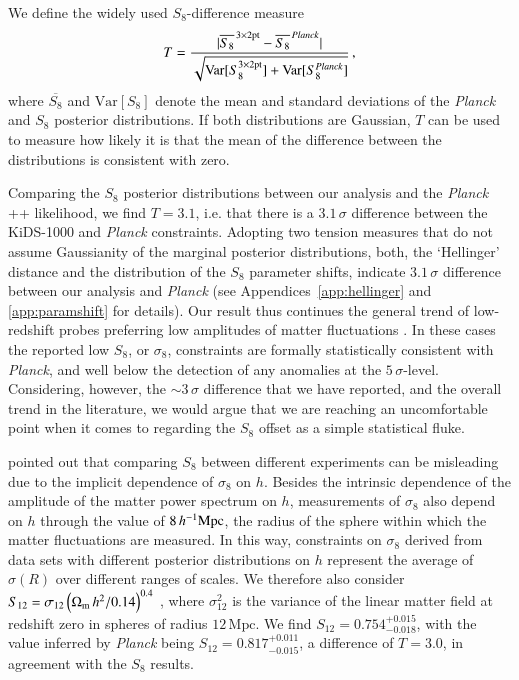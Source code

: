 We define the widely used $S_8$-difference measure
\begin{equation}
\label{eq: std_tension}
T = \frac{|\overline{S_{8}}^{\,\rm 3\times2pt}-\overline{S_{8}}^{\,\it Planck}|}{\sqrt{\mathrm{Var}[S_{8}^{\rm 3\times2pt}] + \mathrm{Var}[S_{8}^{\it Planck}]}} \,,
\end{equation}
where $\overline{S_{8}}$ and $\mathrm{Var}[S_{8}] $ denote the mean and standard deviations of the {\it Planck} and \tttp $S_8$ posterior distributions.  If both distributions are Gaussian, $T$ can be used to measure how likely it is that the mean of the difference between the distributions is consistent with zero.

Comparing the $S_{8}$ posterior distributions between our \tttp analysis and the {\it Planck} ++ likelihood, we find $T=3.1$, i.e. that there is a $3.1\,\sigma$ difference between the KiDS-1000 and {\it Planck} constraints. 
%  
Adopting two tension measures that do not assume Gaussianity of the marginal posterior distributions, both, the `Hellinger' distance and the distribution of the $S_{8}$ parameter shifts, indicate $3.1\,\sigma$ difference between our \tttp analysis and {\it Planck} (see Appendices~\ref{app:hellinger} and \ref{app:paramshift} for details).  
%
Our result thus continues the general trend of low-redshift probes preferring low amplitudes of matter fluctuations \citep{heymans/etal:2013, alam/etal:2017, abbott/etal:2018, hikage/etal:2019, bocquet/etal:2019, wright/etal:2020b,DESclusters/etal:2020}. 
In these cases the reported low $S_8$, or $\sigma_8$, constraints are formally statistically consistent with {\it Planck}, and well below the detection of any anomalies at the $5\,\sigma$-level. 
Considering, however, the $\sim\! 3\,\sigma$ difference that we have reported, and the overall trend in the literature, we would argue that we are reaching an uncomfortable point when it comes to regarding the $S_8$ offset as a simple statistical fluke.

\citet{Sanchez2020} pointed out that comparing $S_{8}$ between different experiments can be misleading due to the implicit dependence of $\sigma_{8}$ on $h$. 
Besides the intrinsic dependence of the amplitude of the matter power spectrum on $h$, measurements of $\sigma_{8}$ also depend on $h$ through the value of $8\,h^{-1}{\rm Mpc}$, the radius of the sphere within which the matter fluctuations are measured. 
In this way, constraints on $\sigma_8$ derived from data sets with different posterior distributions on $h$ represent the average of $\sigma(R)$ over different ranges of scales. 
%
We therefore also consider $S_{12} = \sigma_{12}\left(\Omega_{\rm m}\,h^2/0.14\right)^{0.4}$ \citep{Sanchez2020}, where $\sigma_{12}^{2}$ is the variance of the linear matter field at redshift zero in spheres of radius $12\,\mathrm{Mpc}$.
We find $S_{12} = 0.754^{+0.015}_{-0.018}$, with the value inferred by {\it Planck} being $S_{12} = 0.817_{-0.015}^{+0.011}
$, a difference of $T=3.0$, in agreement with the $S_8$ results. 

